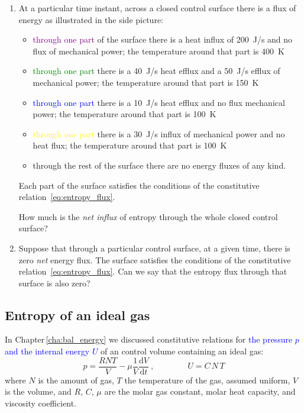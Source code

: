 \documentclass[a4paper,12pt,%
onecolumn,oneside,%
british%
]{memoir}
\newcommand*{\di}{\mathrm{d}}%
\renewcommand*{\|}[1][]{\nonscript\:#1\vert\nonscript\:\mathopen{}}
\newcommand*{\sect}{\S}%
\newcommand*{\chap}{Chapter}%
\renewcommand*{\autoref}[2]{\sidepar{\vspace{-1ex}\footnotesize{\color{blue}\faIcon{%
angle-right%
}\enspace\sect\,\ref{#1} page\,\pageref{#1}}}\textcolor{blue}{#2}}
\newcommand*{\yvis}{\mu} %
\newcommand*{\yN}{N}
\newcommand*{\yU}{U}
\newcommand*{\ypr}{p} %
\newcommand*{\yT}{T}%
\begin{document}
\begin{exercise}
  \begin{enumerate}[exerc]
  \item At a particular time instant, across a closed control surface there is a flux of energy as illustrated in the side picture:
    \begin{itemize}[shift]
    \item \textcolor{purple}{through one part} of the surface there is a heat influx of \qty{200}{J/s} and no flux of mechanical power; the temperature around that part is \qty{400}{K}
    \item \textcolor{green}{through one part} there is a \qty{40}{J/s} heat efflux and a \qty{50}{J/s} efflux of mechanical power; the temperature around that part is \qty{150}{K}
    \item \textcolor{blue}{through one part} there is a  \qty{10}{J/s} heat efflux and no flux mechanical power; the temperature around that part is \qty{100}{K}
    \item \textcolor{yellow}{through one part}  there is a  \qty{30}{J/s} influx of mechanical power and no heat flux; the temperature around that part is \qty{100}{K}
    \item \textcolor{midgrey}{through the rest} of the surface there are no energy fluxes of any kind.
    \end{itemize}
    Each part of the surface satisfies the conditions of the constitutive relation~\eqref{eq:entropy_flux}.

    \smallskip

    How much is the \emph{net influx} of entropy through the whole closed control surface?

    \bigskip

  \item Suppose that through a particular control surface, at a given time, there is zero \emph{net} energy flux. The surface satisfies the conditions of the constitutive relation~\eqref{eq:entropy_flux}. Can we say that the entropy flux through that surface is also zero?
  \end{enumerate}
\end{exercise}

\subsection{Entropy of an ideal gas}
\label{sec:entropy_ideal_gas}

In \chap\,\ref{cha:bal_energy} we discussed constitutive relations for \autoref{sec:int_energy_idealgas}{the pressure $\ypr$ and the internal energy $\yU$} of an control volume containing an ideal gas:
\begin{equation*}
  \ypr = \frac{R \yN \yT}{V}  - \yvis \frac{1}{V}\frac{\di V}{\di t} \ ,
  \qquad\qquad
  \yU = C\,\yN\,\yT
\end{equation*}
where $\yN$ is the amount of gas, $\yT$ the temperature of the gas, assumed uniform, $V$ is the volume, and $R$, $C$, $\yvis$ are the molar gas constant, molar heat capacity, and viscosity coefficient.
\end{document}
